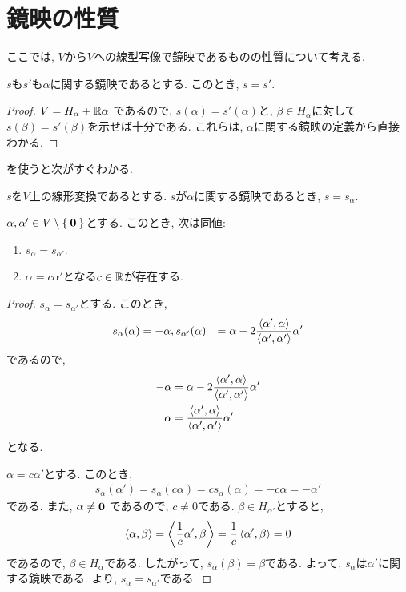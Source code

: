 \section{鏡映の性質}
ここでは, $V$から$V$への線型写像で鏡映であるものの性質について考える.
\begin{lemma}
  \label{lemma:reflisunique}
  $s$も$s'$も$\alpha$に関する鏡映であるとする.
  このとき, $s=s'$.
\end{lemma}
\begin{proof}
  $V =   H_\alpha +  \mathbb{R}\alpha$
  であるので,
  $s(\alpha)=s'(\alpha)$と,
  $\beta\in H_\alpha$に対して
  $s(\beta)=s'(\beta)$を示せば十分である.
  これらは,
  $\alpha$に関する鏡映の定義から直接わかる.
\end{proof}
を使うと次がすぐわかる.
\begin{prop}
  $s$を$V$上の線形変換であるとする.
  $s$が$\alpha$に関する鏡映であるとき, $s=s_\alpha$.
\end{prop}

\begin{prop}
  $\alpha, \alpha' \in V\setminus\Set{\boldsymbol{0}}$とする.
  このとき, 次は同値:
  \begin{enumerate}
  \item $s_\alpha=s_{\alpha'}$.
  \item $\alpha=c\alpha'$となる$c\in \mathbb{R}$が存在する.
  \end{enumerate}
\end{prop}
\begin{proof}
  $s_\alpha=s_{\alpha'}$とする.
  このとき,
  \begin{align*}
    s_\alpha(\alpha) &=-\alpha,
    s_{\alpha'} (\alpha) &= \alpha - 2\frac{\Braket{\alpha',\alpha}}{\Braket{\alpha',\alpha'}}\alpha'
  \end{align*}
  であるので,
  \begin{align*}
    -\alpha &= \alpha - 2\frac{\Braket{\alpha',\alpha}}{\Braket{\alpha',\alpha'}}\alpha'\\
    \alpha &= \frac{\Braket{\alpha',\alpha}}{\Braket{\alpha',\alpha'}}\alpha'
  \end{align*}
  となる.

  $\alpha=c\alpha'$とする.
  このとき,
  \begin{align*}
    s_{\alpha}(\alpha')=s_{\alpha}(c\alpha)=cs_{\alpha}(\alpha)=-c\alpha=-\alpha'
  \end{align*}
  である.
  また,
  $\alpha\neq \boldsymbol{0}$
  であるので, $c\neq 0$である.
  $\beta \in H_{\alpha'}$とすると,
  \begin{align*}
    \Braket{\alpha,\beta}=\Braket{\frac{1}{c}\alpha',\beta}=\frac{1}{c}\Braket{\alpha',\beta}=0
  \end{align*}
  であるので, $\beta \in H_\alpha$である.
  したがって,
  $s_\alpha(\beta)=\beta$である.
  よって, $s_\alpha$は$\alpha'$に関する鏡映である.
  より, $s_\alpha=s_{\alpha'}$である.
\end{proof}


